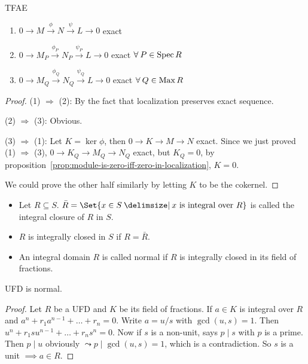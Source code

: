 \begin{prop} \label{prop:localization-preserves-exactness}
  TFAE
  \begin{enumerate}[(1)]
    \item $0 \to M \xrightarrow{\phi} N \xrightarrow{\psi} L \to 0$ exact
    \item $0 \to M_P \xrightarrow{\phi_P} N_P \xrightarrow{\psi_P} L \to 0$
      exact $\forall P \in \Spec R$
    \item $0 \to M_Q \xrightarrow{\phi_Q} N_Q \xrightarrow{\psi_Q} L \to 0$
      exact $\forall Q \in \Max R$
  \end{enumerate}
  \begin{proof}
    (1) $\Rightarrow$ (2): By the fact that localization preserves exact sequence.

    (2) $\Rightarrow$ (3): Obvious.

    (3) $\Rightarrow$ (1): Let $K = \ker \phi$, then $0 \to K \to M \to N$
    exact. Since we just proved (1) $\Rightarrow$ (3),
    $0 \to K_Q \to M_Q \to N_Q$ exact, but $K_Q = 0$,
    by proposition~\ref{prop:module-is-zero-iff-zero-in-localization},
    $K = 0$.

    We could prove the other half similarly by letting $K$ to be the cokernel.
  \end{proof}
\end{prop}

\begin{definition} \mbox{}
  \begin{itemize}
    \item Let $R \subseteq S$. $\bar{R} = \Set{ x\in S \given x
      \text{ is integral over } R}$ is called the integral closure of $R$ in $S$.
    \item $R$ is integrally closed in $S$ if $R = \bar{R}$.
    \item An integral domain $R$ is called normal if $R$ is integrally closed
      in its field of fractions.
  \end{itemize}
\end{definition}

\begin{theorem}
  UFD is normal.
  \begin{proof}
    Let $R$ be a UFD and $K$ be its field of fractions.
    If $a \in K$ is integral over $R$ and $a^n + r_1a^{n-1} + \dots + r_n = 0$.
    Write $a = u/s$ with $\gcd(u, s) = 1$.
    Then $u^n + r_1 s u^{n-1} + \dots + r_n s^n = 0$.
    Now if $s$ is a non-unit, says $p \mid s$ with $p$ is a prime. Then
    $p \mid u$ obviously $\leadsto p \mid \gcd(u, s) = 1$, which is a contradiction.
    So $s$ is a unit $\implies a \in R$.
  \end{proof}
\end{theorem}

